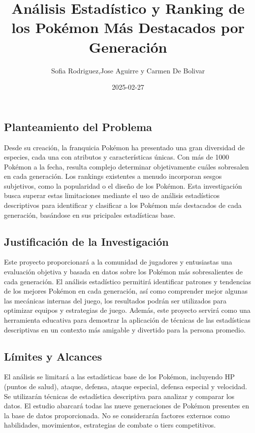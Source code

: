 \documentclass[
]{article}
\title{Análisis Estadístico y Ranking de los Pokémon Más Destacados por
Generación}
\author{Sofia Rodriguez,Jose Aguirre y Carmen De Bolivar}
\date{2025-02-27}
\begin{document}
\maketitle

\subsection{Planteamiento del
Problema}\label{planteamiento-del-problema}

Desde su creación, la franquicia Pokémon ha presentado una gran
diversidad de especies, cada una con atributos y características únicas.
Con más de 1000 Pokémon a la fecha, resulta complejo determinar
objetivamente cuáles sobresalen en cada generación. Los rankings
existentes a menudo incorporan sesgos subjetivos, como la popularidad o
el diseño de los Pokémon. Esta investigación busca superar estas
limitaciones mediante el uso de análisis estadísticos descriptivos para
identificar y clasificar a los Pokémon más destacados de cada
generación, basándose en sus pricipales estadísticas base.

\subsection{Justificación de la
Investigación}\label{justificaciuxf3n-de-la-investigaciuxf3n}

Este proyecto proporcionará a la comunidad de jugadores y entusiastas
una evaluación objetiva y basada en datos sobre los Pokémon más
sobresalientes de cada generación. El análisis estadístico permitirá
identificar patrones y tendencias de los mejores Pokémon en cada
generación, así como comprender mejor algunas las mecánicas internas del
juego, los resultados podrán ser utilizados para optimizar equipos y
estrategias de juego. Además, este proyecto servirá como una herramienta
educativa para demostrar la aplicación de técnicas de las estadísticas
descriptivas en un contexto más amigable y divertido para la persona
promedio.

\subsection{Límites y Alcances}\label{luxedmites-y-alcances}

El análisis se limitará a las estadísticas base de los Pokémon,
incluyendo HP (puntos de salud), ataque, defensa, ataque especial,
defensa especial y velocidad. Se utilizarán técnicas de estadística
descriptiva para analizar y comparar los datos. El estudio abarcará
todas las nueve generaciones de Pokémon presentes en la base de datos
proporcionada. No se considerarán factores externos como habilidades,
movimientos, estrategias de combate o tiers competitivos.
\end{document}
